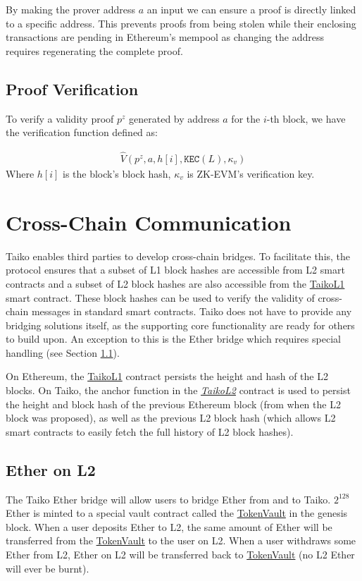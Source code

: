\documentclass[9pt,oneside]{amsart}
\begin{document}
\begin{multicols}{2}
By making the prover address $a$ an input we can ensure a proof is directly linked to a specific address. This prevents proofs from being stolen while their enclosing transactions are pending in Ethereum's mempool as changing the address requires regenerating the complete proof.

\subsection{Proof Verification} To verify a validity proof $p^z$ generated by address $a$ for the $i$-th block, we have the verification function defined as:

\begin{eqnarray}
    \hat{V}(p^z, a, h[i], \texttt{KEC}(L), \kappa_v)
\end{eqnarray}
Where $h[i]$ is the block's block hash, $\kappa_v$ is ZK-EVM's verification key.

\section{Cross-Chain Communication}\label{sec:bridges}
Taiko enables third parties to develop cross-chain bridges. To facilitate this, the protocol ensures that a subset of L1 block hashes are accessible from L2 smart contracts and a subset of  L2 block hashes are also accessible from the \underline{TaikoL1} smart contract. These block hashes can be used to verify the validity of cross-chain messages in standard smart contracts. Taiko does not have to provide any bridging solutions itself, as the supporting core functionality are ready for others to build upon. An exception to this is the Ether bridge which requires special handling (see Section \ref{eth-bridge}). 

On Ethereum, the \underline{TaikoL1} contract persists the height and hash of the L2 blocks. On Taiko, the anchor function in the \emph{\underline{TaikoL2}} contract is used to persist the height and block hash of the previous Ethereum block (from when the L2 block was proposed), as well as the previous L2 block hash (which allows L2 smart contracts to easily fetch the full history of L2 block hashes).

\subsection{Ether on L2}\label{eth-bridge}
The Taiko Ether bridge will allow users to bridge Ether from and to Taiko. $2^{128}$ Ether is minted to a special vault contract called the \underline{TokenVault} in the genesis block. When a user deposits Ether to L2, the same amount of Ether will be transferred from the \underline{TokenVault} to the user on L2. When a user withdraws some Ether from L2, Ether on L2 will be transferred back to \underline{TokenVault} (no L2 Ether will ever be burnt).


\end{multicols}
\end{document}
